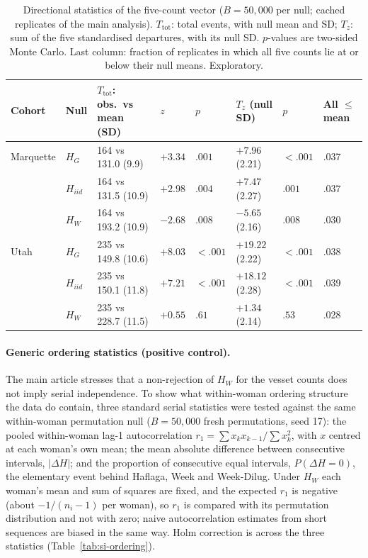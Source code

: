 \documentclass[12pt]{article}
\newcommand{\HG}{H_{G}}
\newcommand{\HI}{H_{iid}}
\newcommand{\HW}{H_{W}}
\begin{document}
\begin{table}[!htbp]
\centering
\caption{Directional statistics of the five-count vector ($B = 50{,}000$ per null; cached
  replicates of the main analysis). $T_{\mathrm{tot}}$: total events, with null mean and SD;
  $T_z$: sum of the five standardised departures, with its null SD. $p$-values are
  two-sided Monte Carlo. Last column: fraction of replicates in which all five counts lie
  at or below their null means. Exploratory.}
\label{tab:si-directional}
\smallskip
\small
\begin{tabular}{L{1.7cm} L{0.9cm} C{2.6cm} C{1.0cm} C{1.3cm} C{1.6cm} C{1.3cm} C{1.6cm}}
\toprule
\textbf{Cohort} & \textbf{Null} & $T_{\mathrm{tot}}$: obs.\ vs mean (SD) & $z$ & $p$ & $T_z$ (null SD) & $p$ & \textbf{All $\leq$ mean} \\
\midrule
Marquette & $\HG$ & 164 vs 131.0 (9.9)  & $+3.34$ & $.001$  & $+7.96$ (2.21) & $<.001$ & .037 \\
          & $\HI$ & 164 vs 131.5 (10.9) & $+2.98$ & $.004$  & $+7.47$ (2.27) & $.001$  & .037 \\
          & $\HW$ & 164 vs 193.2 (10.9) & $-2.68$ & $.008$  & $-5.65$ (2.16) & $.008$  & .030 \\
\midrule
Utah      & $\HG$ & 235 vs 149.8 (10.6) & $+8.03$ & $<.001$ & $+19.22$ (2.22) & $<.001$ & .038 \\
          & $\HI$ & 235 vs 150.1 (11.8) & $+7.21$ & $<.001$ & $+18.12$ (2.28) & $<.001$ & .039 \\
          & $\HW$ & 235 vs 228.7 (11.5) & $+0.55$ & $.61$   & $+1.34$ (2.14)  & $.53$   & .028 \\
\bottomrule
\end{tabular}
\end{table}

\paragraph{Generic ordering statistics (positive control).} The main article stresses that
a non-rejection of $\HW$ for the vesset counts does not imply serial independence. To show
what within-woman ordering structure the data do contain, three standard serial statistics
were tested against the same within-woman permutation null ($B = 50{,}000$ fresh
permutations, seed 17): the pooled within-woman lag-1 autocorrelation
$r_1 = \sum x_k x_{k-1} / \sum x_k^2$, with $x$ centred at each woman's own mean; the mean
absolute difference between consecutive intervals, $\overline{|\Delta H|}$; and the
proportion of consecutive equal intervals, $P(\Delta H = 0)$, the elementary event behind
Haflaga, Week and Week-Dilug. Under $\HW$ each woman's mean and sum of squares are fixed,
and the expected $r_1$ is negative (about $-1/(n_i - 1)$ per woman), so $r_1$ is compared
with its permutation distribution and not with zero; naive autocorrelation estimates from
short sequences are biased in the same way. Holm correction is across the three statistics
(Table~\ref{tab:si-ordering}).
\end{document}
